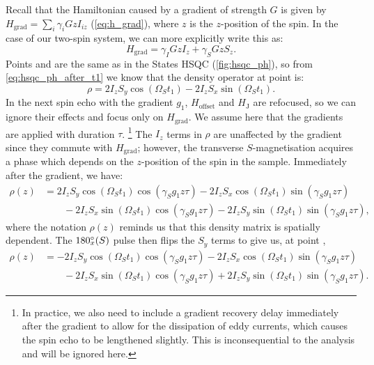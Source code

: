 Recall that the Hamiltonian caused by a gradient of strength $G$ is given by $H_\text{grad} = \sum_i \gamma_i Gz I_{iz}$ (\cref{eq:h_grad}), where $z$ is the $z$-position of the spin.
In the case of our two-spin system, we can more explicitly write this as:
\begin{equation}
    \label{eq:h_grad_is_system}
    H_\text{grad} = \gamma_I Gz I_z + \gamma_S Gz S_z.
\end{equation}
Points  and  are the same as in the States HSQC (\cref{fig:hsqc_ph}), so from \cref{eq:hsqc_ph_after_t1} we know that the density operator at point  is:
\begin{equation}
    \label{eq:hsqc_ea_prodop_2}
    \rho = 2I_zS_y\cos(\Omega_S t_1) - 2I_zS_x \sin(\Omega_S t_1).
\end{equation}
In the next spin echo with the gradient $g_1$, $H_\text{offset}$ and $H_\text{J}$ are refocused, so we can ignore their effects and focus only on $H_\text{grad}$.
We assume here that the gradients are applied with duration $\tau$.%
\footnote{In practice, we also need to include a gradient recovery delay immediately after the gradient to allow for the dissipation of eddy currents, which causes the spin echo to be lengthened slightly. This is inconsequential to the analysis and will be ignored here.}
The $I_z$ terms in $\rho$ are unaffected by the gradient since they commute with $H_\text{grad}$; however, the transverse $S$-magnetisation acquires a phase which depends on the $z$-position of the spin in the sample.
Immediately after the gradient, we have:
\begin{equation}
    \label{eq:hsqc_ea_gradient}
    \begin{aligned}
        \rho(z) &= 2I_zS_y\cos(\Omega_S t_1)\cos(\gamma_S g_1 z \tau) - 2I_zS_x\cos(\Omega_S t_1)\sin(\gamma_S g_1 z \tau) \\
                &\quad\quad {} - 2I_zS_x \sin(\Omega_S t_1)\cos(\gamma_S g_1 z \tau) - 2I_zS_y\sin(\Omega_S t_1)\sin(\gamma_S g_1 z \tau),
    \end{aligned}
\end{equation}
where the notation $\rho(z)$ reminds us that this density matrix is spatially dependent.
The $\angang{180}{x}(S)$ pulse then flips the $S_y$ terms to give us, at point ,
\begin{equation}
    \label{eq:hsqc_ea_after_grad_echo}
    \begin{aligned}
        \rho(z) &= -2I_zS_y\cos(\Omega_S t_1)\cos(\gamma_S g_1 z \tau) - 2I_zS_x\cos(\Omega_S t_1)\sin(\gamma_S g_1 z \tau) \\
                &\quad\quad {} - 2I_zS_x \sin(\Omega_S t_1)\cos(\gamma_S g_1 z \tau) + 2I_zS_y\sin(\Omega_S t_1)\sin(\gamma_S g_1 z \tau).
    \end{aligned}
\end{equation}
